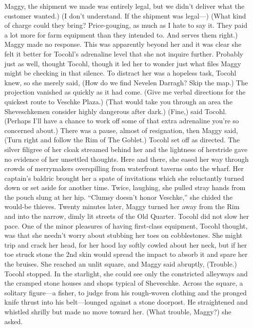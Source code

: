 \documentclass[9pt]{article}
\begin{document}
Maggy, the shipment we made was entirely legal, but we didn’t deliver what the customer wanted.)
(I don’t understand. If the shipment was legal—)
(What kind of charge could they bring? Price-gouging, as much as I hate to say it. They paid a lot
more for farm equipment than they intended to. And serves them right.)
Maggy made no response. This was apparently beyond her and it was clear she felt it better for
Tocohl’s adrenaline level that she not inquire further.
Probably just as well, thought Tocohl, though it led her to wonder just what files Maggy might be
checking in that silence. To distract her was a hopeless task, Tocohl knew, so she merely said, (How do
we find Nevelen Darragh? Skip the map.) The projection vanished as quickly as it had come. (Give me
verbal directions for the quickest route to Veschke Plaza.)
(That would take you through an area the Sheveschkemen consider highly dangerous after dark.)
(Fine,) said Tocohl. (Perhaps I’ll have a chance to work off some of that extra adrenaline you’re so
concerned about.)
There was a pause, almost of resignation, then Maggy said, (Turn right and follow the Rim of The
Goblet.)
Tocohl set off as directed. The silver filigree of her cloak streamed behind her and the lightness of herstride gave no evidence of her unsettled thoughts.
Here and there, she eased her way through crowds of merrymakers overspilling from waterfront
taverns onto the wharf. Her captain’s baldric brought her a spate of invitations which she reluctantly
turned down or set aside for another time. Twice, laughing, she pulled stray hands from the pouch slung
at her hip. “Clumsy doesn’t honor Veschke,” she chided the would-be thieves.
Twenty minutes later, Maggy turned her away from the Rim and into the narrow, dimly lit streets of
the Old Quarter.
Tocohl did not slow her pace. One of the minor pleasures of having first-class equipment, Tocohl
thought, was that she needn’t worry about stubbing her toes on cobblestones. She might trip and crack
her head, for her hood lay softly cowled about her neck, but if her toe struck stone the 2nd skin would
spread the impact to absorb it and spare her the bruises.
She reached an unlit square, and Maggy said abruptly, (Trouble.)
Tocohl stopped. In the starlight, she could see only the constricted alleyways and the cramped stone
houses and shops typical of Sheveschke.
Across the square, a solitary figure—a fisher, to judge from his rough-woven clothing and the
pronged knife thrust into his belt—lounged against a stone doorpost. He straightened and whistled shrilly
but made no move toward her.
(What trouble, Maggy?) she asked.
\end{document}
